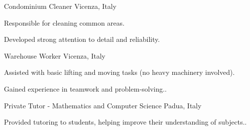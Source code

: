 

\begin{cventries}

  \cventry
    {Condominium Cleaner} %
    {} %
    {Vicenza, Italy} %
    {} %
    {
    \begin{cvitems}
    		\item Responsible for cleaning common areas.
    		\item Developed strong attention to detail and reliability.
    \end{cvitems}
    }
\hfill \break
  \cventry
    {Warehouse Worker} %
    {} %
	{Vicenza, Italy} %
    {} %
    {
      \begin{cvitems} %
        \item {Assisted with basic lifting and moving tasks (no heavy machinery involved)}.
        \item {Gained experience in teamwork and problem-solving.}.
      \end{cvitems}
    }
\hfill \break
  \cventry
    {Private Tutor - Mathematics and Computer Science} %
    {} %
	{Padua, Italy} %
    {} %
    {
      \begin{cvitems} %
        \item {Provided tutoring to students, helping improve their understanding of subjects.}.
      \end{cvitems}
    }

\end{cventries}
